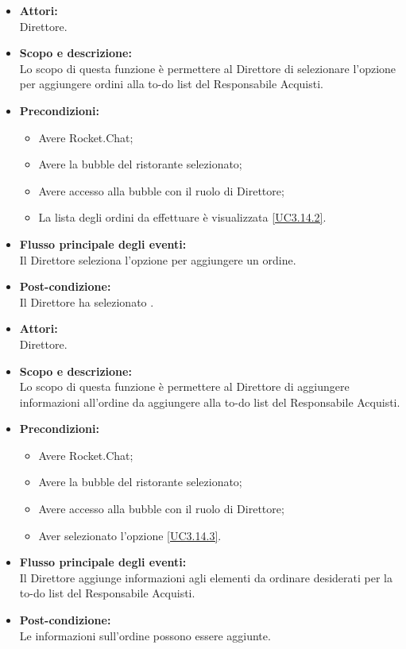 
\begin{itemize}
	\item \textbf{Attori:}
	\\Direttore.
	\item \textbf{Scopo e descrizione:} 
	\\Lo scopo di questa funzione è permettere al Direttore di selezionare l'opzione per aggiungere ordini alla to-do list del Responsabile Acquisti.
	\item \textbf{Precondizioni:}
	\begin{itemize}
		\item Avere Rocket.Chat;
		\item Avere la bubble del ristorante selezionato;
		\item Avere accesso alla bubble con il ruolo di Direttore;
		\item La lista degli ordini da effettuare è visualizzata \ref{UC3.14.2}.
	\end{itemize}
	\item \textbf{Flusso principale degli eventi:}
	\\Il Direttore seleziona l'opzione per aggiungere un ordine.
	\item \textbf{Post-condizione:}
	\\Il Direttore ha selezionato .
\end{itemize}


\begin{itemize}
	\item \textbf{Attori:}
	\\Direttore.
	\item \textbf{Scopo e descrizione:} 
	\\Lo scopo di questa funzione è permettere al Direttore di aggiungere informazioni all'ordine da aggiungere alla to-do list del Responsabile Acquisti.
	\item \textbf{Precondizioni:}
	\begin{itemize}
		\item Avere Rocket.Chat;
		\item Avere la bubble del ristorante selezionato;
		\item Avere accesso alla bubble con il ruolo di Direttore;
		\item Aver selezionato l'opzione  \ref{UC3.14.3}.
	\end{itemize}
	\item \textbf{Flusso principale degli eventi:}
	\\Il Direttore aggiunge informazioni agli elementi da ordinare desiderati per la to-do list del Responsabile Acquisti.
	\item \textbf{Post-condizione:}
	\\Le informazioni sull'ordine possono essere aggiunte.
\end{itemize}

